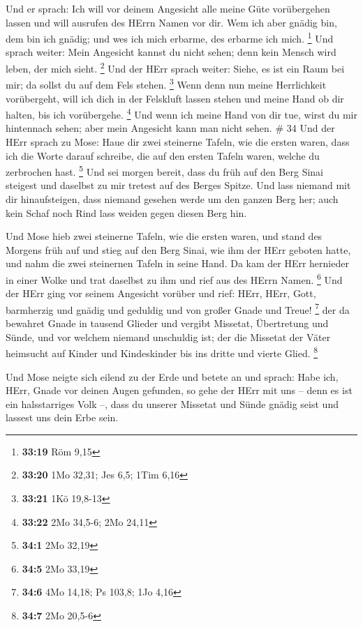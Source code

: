 Und er sprach: Ich will vor deinem Angesicht alle meine
Güte vorübergehen lassen und will ausrufen des HErrn Namen vor dir. Wem
ich aber gnädig bin, dem bin ich gnädig; und wes ich mich erbarme, des
erbarme ich mich. \footnote{\textbf{33:19} Röm 9,15}  Und
sprach weiter: Mein Angesicht kannst du nicht sehen; denn kein Mensch
wird leben, der mich sieht. \footnote{\textbf{33:20} 1Mo 32,31; Jes 6,5;
  1Tim 6,16}  Und der HErr sprach weiter: Siehe, es ist ein
Raum bei mir; da sollst du auf dem Fels stehen. \footnote{\textbf{33:21}
  1Kö 19,8-13}  Wenn denn nun meine Herrlichkeit
vorübergeht, will ich dich in der Felskluft lassen stehen und meine Hand
ob dir halten, bis ich vorübergehe. \footnote{\textbf{33:22} 2Mo 34,5-6;
  2Mo 24,11}  Und wenn ich meine Hand von dir tue, wirst du
mir hintennach sehen; aber mein Angesicht kann man nicht sehen. \# 34
 Und der HErr sprach zu Mose: Haue dir zwei steinerne
Tafeln, wie die ersten waren, dass ich die Worte darauf schreibe, die
auf den ersten Tafeln waren, welche du zerbrochen hast. \footnote{\textbf{34:1}
  2Mo 32,19}  Und sei morgen bereit, dass du früh auf den
Berg Sinai steigest und daselbst zu mir tretest auf des Berges Spitze.
 Und lass niemand mit dir hinaufsteigen, dass niemand
gesehen werde um den ganzen Berg her; auch kein Schaf noch Rind lass
weiden gegen diesen Berg hin.

 Und Mose hieb zwei steinerne Tafeln, wie die ersten waren,
und stand des Morgens früh auf und stieg auf den Berg Sinai, wie ihm der
HErr geboten hatte, und nahm die zwei steinernen Tafeln in seine Hand.
 Da kam der HErr hernieder in einer Wolke und trat daselbst
zu ihm und rief aus des HErrn Namen. \footnote{\textbf{34:5} 2Mo 33,19}
 Und der HErr ging vor seinem Angesicht vorüber und rief:
HErr, HErr, Gott, barmherzig und gnädig und geduldig und von großer
Gnade und Treue! \footnote{\textbf{34:6} 4Mo 14,18; Ps 103,8; 1Jo 4,16}
 der da bewahret Gnade in tausend Glieder und vergibt
Missetat, Übertretung und Sünde, und vor welchem niemand unschuldig ist;
der die Missetat der Väter heimsucht auf Kinder und Kindeskinder bis ins
dritte und vierte Glied. \footnote{\textbf{34:7} 2Mo 20,5-6}

 Und Mose neigte sich eilend zu der Erde und betete an
 und sprach: Habe ich, HErr, Gnade vor deinen Augen
gefunden, so gehe der HErr mit uns -- denn es ist ein halsstarriges Volk
--, dass du unserer Missetat und Sünde gnädig seist und lassest uns dein
Erbe sein.


